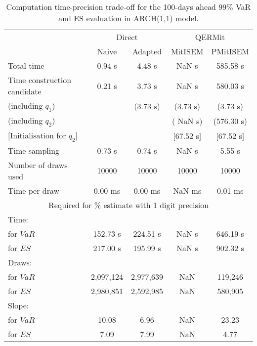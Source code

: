 { \renewcommand{\arraystretch}{1.3} 
\begin{table}[h] 
\centering 
\caption{Computation time-precision trade-off for the 100-days ahead  $99\%$ VaR and ES evaluation in ARCH(1,1) model.} 
\label{tab:time_precision_arch} 
\begin{tabular}{lcccc}  
  & \multicolumn{2}{c}{Direct} & \multicolumn{2}{c}{QERMit}  \\ \cline{2-5} 
  & Naive & Adapted & MitISEM & PMitISEM  \\ \hline 
Total time & 0.94 s & 4.48 s &  NaN s & 585.58 s \\ 
Time construction candidate & 0.21 s & 3.73 s &  NaN s & 580.03 s \\ 
 (including $q_{1}$) &   &  (3.73 s) & (3.73 s) & (3.73 s) \\ 
 (including $q_{2}$) &   &  & ( NaN s) & (576.30 s) \\ 
$[$Initialisation for $q_{2}$$]$&   &   & $[$67.52 s$]$ & $[$67.52 s$]$ \\ 
Time sampling & 0.73 s & 0.74 s &  NaN s & 5.55 s  \\  
Number of draws used & 10000 & 10000 & 10000 & 10000 \\ 
Time per draw & 0.00 ms & 0.00 ms &  NaN ms & 0.01 ms \\ \hline 
\multicolumn{5}{c}{Required for \% estimate with 1 digit precision} \\ \hline 
Time: &  &  &   &  \\ 
\hspace{1cm} for $VaR$ & 152.73 s & 224.51 s &  NaN s & 646.19 s \\ 
\hspace{1cm} for $ES$ & 217.00 s & 195.99 s &  NaN s & 902.32 s \\ 
Draws: &  &  &   &  \\ 
\hspace{1cm} for $VaR$ & 2,097,124 & 2,977,639  & NaN  & 119,246  \\ 
\hspace{1cm} for $ES$ & 2,980,851 & 2,592,985  & NaN   & 580,905  \\ 
\hline 
Slope: &  &  &   &  \\ 
\hspace{1cm} for $VaR$ & 10.08 & 6.96  &  NaN  & 23.23  \\ 
\hspace{1cm} for $ES$ & 7.09 & 7.99  &  NaN   & 4.77  \\  \hline 
\end{tabular} 
\end{table} 
} 
